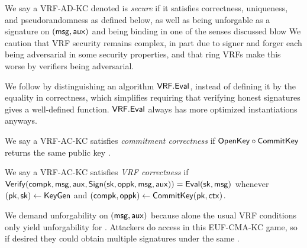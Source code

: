 

We say a VRF-AD-KC denoted \VRF is {\em secure} if it satisfies
 correctness, uniqueness, and pseudorandomness as defined below,
 as well as being unforgable as a signature on $(\mathsf{msg},\mathsf{aux})$ and
 being binding in one of the senses discussed blow
We caution that VRF security remains complex, in part due to
signer and forger each being adversarial in some security properties,
and that ring VRFs make this worse by verifiers being adversarial.

We follow \cite{agg_dkg} by distinguishing an algorithm ${\mathsf{VRF}}.{\mathsf{Eval}}$,
 instead of defining it by the equality in correctness,
which simplifies requiring that verifying honest signatures gives a well-defined function.
${\mathsf{VRF}}.{\mathsf{Eval}}$ always has more optimized instantiations anyways.

\begin{definition}
We say a VRF-AC-KC satisfies {\em commitment correctness} if
 ${\mathsf{OpenKey}} \circ {\ensuremath{\mathsf{CommitKey}}}$ returns the same public key \pk.
\end{definition}

\begin{definition}
We say a VRF-AC-KC satisfies {\em VRF correctness} if
 ${\mathsf{Verify}}(\mathsf{compk},\mathsf{msg},\mathsf{aux},{\mathsf{Sign}}(\mathsf{sk},\mathsf{oppk},\mathsf{msg},\mathsf{aux})) = {\mathsf{Eval}}(\mathsf{sk},\mathsf{msg})$ whenever
 $(\mathsf{pk},\mathsf{sk}) \leftarrow {\ensuremath{\mathsf{KeyGen}}}$ and $(\mathsf{compk},\mathsf{oppk}) \leftarrow {\ensuremath{\mathsf{CommitKey}}}(\mathsf{pk},\mathsf{ctx})$.
\end{definition}

We demand unforgability on $(\mathsf{msg},\mathsf{aux})$ because alone
 the usual VRF conditions only yield unforgability for \msg.
Attackers do access \CommitKey in this EUF-CMA-KC game, so if desired
 they could obtain multiple signatures under the same \compk.

